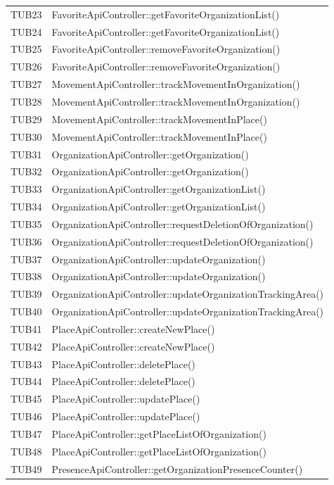 {\begin{longtable}{C{2cm} C{8cm}}
TUB23 & FavoriteApiController::getFavoriteOrganizationList()\\
TUB24 & FavoriteApiController::getFavoriteOrganizationList()\\
TUB25 & FavoriteApiController::removeFavoriteOrganization()\\
TUB26 & FavoriteApiController::removeFavoriteOrganization()\\
TUB27 & MovementApiController::trackMovementInOrganization()\\
TUB28 & MovementApiController::trackMovementInOrganization()\\
TUB29 & MovementApiController::trackMovementInPlace()\\
TUB30 & MovementApiController::trackMovementInPlace()\\
TUB31 & OrganizationApiController::getOrganization()\\
TUB32 & OrganizationApiController::getOrganization()\\
TUB33 & OrganizationApiController::getOrganizationList()\\
TUB34 & OrganizationApiController::getOrganizationList()\\
TUB35 & OrganizationApiController::requestDeletionOfOrganization()\\
TUB36 & OrganizationApiController::requestDeletionOfOrganization()\\
TUB37 & OrganizationApiController::updateOrganization()\\
TUB38 & OrganizationApiController::updateOrganization()\\
TUB39 & OrganizationApiController::updateOrganizationTrackingArea()\\
TUB40 & OrganizationApiController::updateOrganizationTrackingArea()\\
TUB41 & PlaceApiController::createNewPlace()\\
TUB42 & PlaceApiController::createNewPlace()\\
TUB43 & PlaceApiController::deletePlace()\\
TUB44 & PlaceApiController::deletePlace()\\
TUB45 & PlaceApiController::updatePlace()\\
TUB46 & PlaceApiController::updatePlace()\\
TUB47 & PlaceApiController::getPlaceListOfOrganization()\\
TUB48 & PlaceApiController::getPlaceListOfOrganization()\\
TUB49 & PresenceApiController::getOrganizationPresenceCounter()\\

\end{longtable}}
